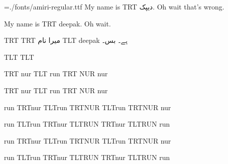 
\nopagenumbers
\parindent=0mm
\font\amiri={./fonts/amiri-regular.ttf}
\amiri
My name is {\textdir TRT دیپک}. Oh wait that’s wrong.

My name is {\textdir TRT deepak}. Oh wait.

\pardir TRT
\textdir TRT
میرا نام {\textdir TLT deepak} ہے۔ بس۔

\pardir TLT
\textdir TLT

\textdir TRT nur {\textdir TLT run \textdir TRT NUR} nur

\textdir TRT nur {{\textdir TLT run} {\textdir TRT NUR}} nur


\def\ltr{\textdir TLT\relax}
\def\rtl{\textdir TRT\relax}

run {\rtl nur {\ltr run \rtl NUR \ltr run \rtl NUR} nur}

run {\ltr run {\rtl nur \ltr RUN \rtl nur \ltr RUN} run}


\def\ltr{\linedir TLT\relax}
\def\rtl{\linedir TRT\relax}

run {\rtl nur {\ltr run \rtl NUR \ltr run \rtl NUR} nur}

run {\ltr run {\rtl nur \ltr RUN \rtl nur \ltr RUN} run}

\bye
